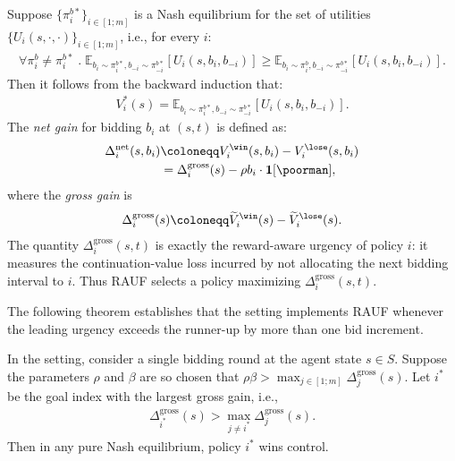 Suppose $\{\pi_i^{b*}\}_{i\in [1;m]}$ is a Nash equilibrium for the set of utilities $\{U_i(s,\cdot,\cdot)\}_{i\in [1;m]}$, i.e., for every $i$:
\begin{align*}
	\forall \pi_i^b\neq \pi_i^{b*}\;.\;\mathbb{E}_{b_i\sim \pi_i^{b*},b_{-i}\sim\pi_{-i}^{b*}}[U_i(s,b_i,b_{-i})] \geq \mathbb{E}_{b_i\sim \pi_i^{b},b_{-i}\sim\pi_{-i}^{b*}}[U_i(s,b_i,b_{-i})].
\end{align*}
Then it follows from the backward induction that:
\begin{align*}
	V_i^*(s) = \mathbb{E}_{b_i\sim \pi_i^{b*},b_{-i}\sim\pi_{-i}^{b*}}[U_i(s,b_i,b_{-i})].
\end{align*}
The \emph{net gain} for bidding $b_i$ at $(s,t)$ is defined as:
\begin{align*}
	\Delta_i^{\mathrm{net}}(s,b_i)&\coloneqq V^{\win}_i(s,b_i) - V^{\lose}_i(s,b_i)\\
	&=  \Delta^{\mathrm{gross}}_i(s) - \rho b_i\cdot \mathbf{1}[\text{\poorman}],
\end{align*}
where the \emph{gross gain} is
\begin{align*}
	\Delta^{\mathrm{gross}}_i(s)\coloneqq \widetilde V_i^{\win}(s)-\widetilde V_i^{\lose}(s).
\end{align*}
The quantity $\Delta^{\mathrm{gross}}_i(s,t)$ is exactly the reward-aware urgency of policy $i$: it measures the continuation-value loss incurred by not allocating the next bidding interval to $i$.
Thus RAUF selects a policy maximizing $\Delta^{\mathrm{gross}}_i(s,t)$.

The following theorem establishes that the \poorman setting implements RAUF whenever the leading urgency exceeds the runner-up by more than one bid increment.

\begin{theorem}
	In the \poorman setting, consider a single bidding round at the agent state $s\in S$.
 	Suppose the parameters $\rho$ and $\beta$ are so chosen that $\rho\beta > \max_{j\in [1;m]}\Delta_j^{\mathrm{gross}}(s)$.
	Let $i^*$ be the goal index with the largest gross gain, i.e.,
	\begin{align}\label{eq:all pay:gross gain gap}
		\Delta_{i^*}^{\mathrm{gross}}(s) > \max_{j\neq i^*}\Delta_j^{\mathrm{gross}}(s).
	\end{align}
	Then in any pure Nash equilibrium, policy $i^*$ wins control.
\end{theorem}

